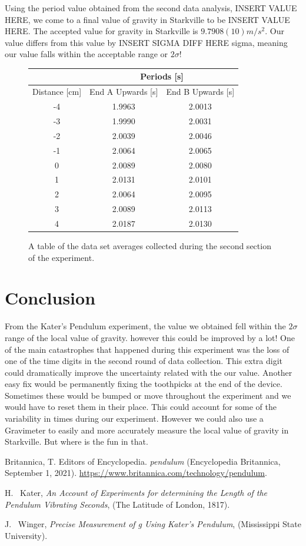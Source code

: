 \documentclass[aps,prl,10pt,twocolumn,floatfix]{revtex4-2}
\begin{document}
Using the period value obtained from the second data analysis, INSERT VALUE HERE, we come to a final value of gravity in Starkville to be INSERT VALUE HERE. 
The accepted value for gravity in Starkville is $9.7908(10)m/s^2$.
Our value differs from this value by INSERT SIGMA DIFF HERE sigma, meaning our value falls within the acceptable range or $2\sigma$! 

\begin{figure}
\begin{tabular}{|c|c|c|}
\hline
& \multicolumn{2}{|c|}{Periods [s]}\\
\hline
Distance [cm] & End A Upwards [s] & End B Upwards [s]\\
\hline
-4&	1.9963&	2.0013\\
-3&	1.9990&	2.0031\\
-2&	2.0039&	2.0046\\
-1&	2.0064&	2.0065\\
0&	2.0089&	2.0080\\
1&	2.0131&	2.0101\\
2&	2.0064&	2.0095\\
3&	2.0089&	2.0113\\
4&	2.0187&	2.0130\\
\hline
\end{tabular}
\caption{A table of the data set averages collected during the second section of the experiment.}
\label{2ndTable}
\end{figure}


\section{Conclusion}
From the Kater's Pendulum experiment, the value we obtained fell within the $2\sigma$ range of the local value of gravity.
however this could be improved by a lot!
One of the main catastrophes that happened during this experiment was the loss of one of the time digits in the second round of data collection. 
This extra digit could dramatically improve the uncertainty related with the our value.
Another easy fix would be permanently fixing the toothpicks at the end of the device.
Sometimes these would be bumped or move throughout the experiment and we would have to reset them in their place.
This could account for some of the variability in times during our experiment. 
However we could also use a Gravimeter to easily and more accurately measure the local value of gravity in Starkville.
But where is the fun in that.

\begin{thebibliography}{9}
 Britannica, T. Editors of Encyclopedia. \textit{pendulum} (Encyclopedia Britannica, September 1, 2021). \url{https://www.britannica.com/technology/pendulum}.

 H. ~Kater, \textit{An Account of Experiments for determining the Length of the Pendulum Vibrating Seconds}, (The Latitude of London, 1817).

 J. ~Winger, \textit{Precise Measurement of g Using Kater’s Pendulum}, (Mississippi State University).
\end{thebibliography}
\end{document}
